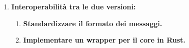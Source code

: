 \documentclass[12pt, a4paper]{article}
\begin{document}
\begin{enumerate}
    \color{magenta}    
    \item \textbf{Interoperabilità tra le due versioni:}
        \begin{enumerate}
            \item \textbf{Standardizzare il formato dei messaggi.}
            \item \textbf{Implementare un wrapper per il core in Rust.}
        \end{enumerate}
\end{enumerate}
\end{document}
